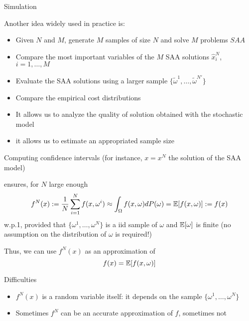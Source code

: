 \begin{frame}{Simulation}

Another idea widely used in practice is:
\begin {itemize}
\item Given $ N $ and $ M $, generate $ M $  samples of size $ N $ and solve $ M $ problems $ SAA $
\pula

\item Compare the most important variables of the $ M $  SAA solutions $ \hat x^N_i$, $ i = 1, \ldots, M$
\pula

\item Evaluate the SAA solutions using a larger sample $\{ \tilde \omega^1, \ldots, \tilde \omega^{N'} \}$
\pula

\item Compare the empirical cost distributions
\end{itemize}
\pula


\pula
{}
\begin{itemize}
\item It allows  us to analyze the quality of solution obtained with the stochastic model
\pula

\item it allows us to estimate an appropriated sample size
\end{itemize}
\end{frame} 


\begin{frame}{Computing confidence intervals}
(for instance, $x=x^N$ the solution of the SAA model)

\pula

 ensures, for $N$ large enough
\[
f^N(x):=\frac{1}{N}\sum_{i=1}^N f(x,\omega^i) \approx \int_{\Omega}f(x,\omega)dP(\omega)=\mathbb{E}[f(x,\omega)]:=f(x)
\]
w.p.1, provided that $\{\omega^1,\ldots, \omega^N\}$ is a iid sample of $\omega$ and $\mathbb{E}[\omega]$ is finite (no assumption on the distribution of $\omega$ is required!)
\pula

Thus, we can use $f^N(x)$ as an approximation of \[f(x)=\mathbb{E}[f(x,\omega)]\]

\begin{block}{Difficulties}
\begin{itemize}
\item $f^N(x)$ is a random variable itself: it depends on the sample $\{\omega^1,\ldots, \omega^N\}$
\pula

\item Sometimes $f^N$ can be an accurate approximation of $f$, sometimes not
\end{itemize}
\end{block}
 \end{frame} 

